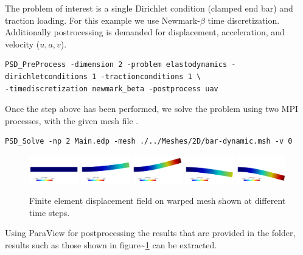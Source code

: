 \newcommand{\psd}[1]{{\small\sffamily{\color{blue!60}#1}}}



The problem of interest is a single Dirichlet condition (clamped end
bar) and traction loading. For this example we use Newmark-\(\beta\)
time discretization. Additionally postrocessing is demanded for
displacement, acceleration, and velocity (\(u,a,v\)).

\begin{lstlisting}[style=BashInputStyle]
PSD_PreProcess -dimension 2 -problem elastodynamics -dirichletconditions 1 -tractionconditions 1 \
-timediscretization newmark_beta -postprocess uav
\end{lstlisting}

Once the step above has been performed, we solve the problem using two
MPI processes, with the given mesh file \psd{bar-dynamic.msh}.

\begin{lstlisting}[style=BashInputStyle]
PSD_Solve -np 2 Main.edp -mesh ./../Meshes/2D/bar-dynamic.msh -v 0
\end{lstlisting}

\begin{figure}[h!]
\includegraphics[width=0.19\textwidth]{./Images/ed-u0.png}
\includegraphics[width=0.19\textwidth]{./Images/ed-u2.png}
\includegraphics[width=0.19\textwidth]{./Images/ed-u3.png}
\includegraphics[width=0.19\textwidth]{./Images/ed-u4.png}
\includegraphics[width=0.19\textwidth]{./Images/ed-u5.png}
\caption{Finite element displacement field on warped mesh shown at different time steps. \label{bar-ed}}
\end{figure}

Using ParaView for postprocessing the results that are provided in the
\psd{VTUs...} folder, results such as those shown in
figure\textasciitilde{}\ref{bar-ed} can be extracted.
